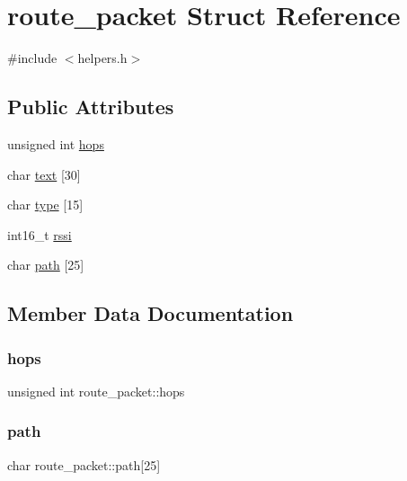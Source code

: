 \hypertarget{structroute__packet}{}\section{route\+\_\+packet Struct Reference}
\label{structroute__packet}


{\ttfamily \#include $<$helpers.\+h$>$}

\subsection*{Public Attributes}
\begin{DoxyCompactItemize}
\item 
unsigned int \hyperlink{structroute__packet_a7cedc73b911ec880ceb95a7d63f15ff8}{hops}
\item 
char \hyperlink{structroute__packet_a6b864e8792e5751471f877c7efa1a46d}{text} \mbox{[}30\mbox{]}
\item 
char \hyperlink{structroute__packet_afd9580ed7894818ee007efeca655f959}{type} \mbox{[}15\mbox{]}
\item 
int16\+\_\+t \hyperlink{structroute__packet_a639f32eda5987c393538482b2f99435c}{rssi}
\item 
char \hyperlink{structroute__packet_ac3dc1e601d931f47c0954c9e2838e0a0}{path} \mbox{[}25\mbox{]}
\end{DoxyCompactItemize}


\subsection{Member Data Documentation}
\mbox{\label{structroute__packet_a7cedc73b911ec880ceb95a7d63f15ff8}} 
\subsubsection{\texorpdfstring{hops}{hops}}
{\footnotesize\ttfamily unsigned int route\+\_\+packet\+::hops}

\mbox{\label{structroute__packet_ac3dc1e601d931f47c0954c9e2838e0a0}} 
\subsubsection{\texorpdfstring{path}{path}}
{\footnotesize\ttfamily char route\+\_\+packet\+::path\mbox{[}25\mbox{]}}

